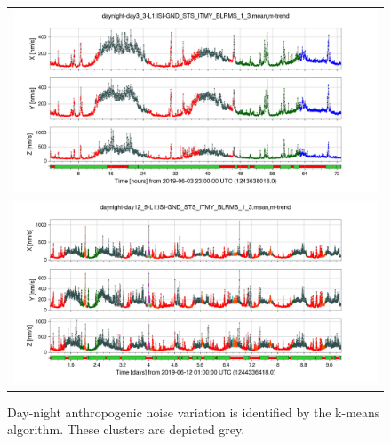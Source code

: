 \documentclass[colorlinks=true,pdfstartview=FitV,linkcolor=blue,
            citecolor=red,urlcolor=magenta]{ligodoc}
\begin{document}
\begin{figure}
  \begin{minipage}[t]{0.3\textwidth}
    \caption{Day-night anthropogenic noise variation is identified by the k-means algorithm. These clusters are depicted grey.}
  \end{minipage}\hfill
  \begin{minipage}[c]{0.67\textwidth}
    \begin{tabular}{c}
      \includegraphics[width=\textwidth]{assets/report1/daynight-day3_3-L1:ISI-GND_STS_ITMY_BLRMS_1_3mean,m-trend.png}\\
      \includegraphics[width=\textwidth]{assets/report1/daynight-day12_9-L1:ISI-GND_STS_ITMY_BLRMS_1_3mean,m-trend.png}
    \end{tabular}
  \end{minipage}
\end{figure}
\end{document}
